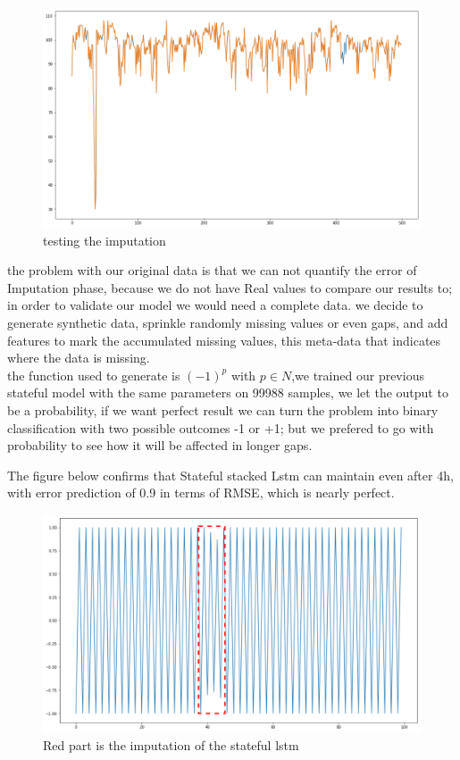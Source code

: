 \begin{figure}[!h]
\centering
\includegraphics[scale=.4]{img/best_result.png}  
\caption{testing the imputation}
\label{fig:verbose}
\end{figure}
the problem with our original data is that we can not quantify the error of Imputation phase, because we do not have Real values to compare our results to; in order to validate our model we would need a complete data.
we decide to  generate synthetic data, sprinkle randomly missing values or even gaps, and add features to mark the accumulated missing values, this  meta-data that indicates where the data is missing.\\the function used to  generate is $(-1)^{p}$ with $p \in N$,we trained our previous stateful model with the same parameters on 99988 samples, we let the output to be a probability, if we want perfect result we can turn the problem into binary classification with two possible outcomes -1 or +1; but we prefered to go with probability to see how it will be affected in longer gaps.
\newpage

The figure below confirms that Stateful stacked Lstm can  maintain even after 4h, with error prediction  of  0.9 in terms of RMSE, which is nearly perfect.    

\begin{figure}[!h]
\centering
\includegraphics[scale=.4]{img/synthetic_data_lstm.png}  
\caption{Red part is the imputation of the stateful lstm }
\label{fig:state_lstm}
\end{figure}

